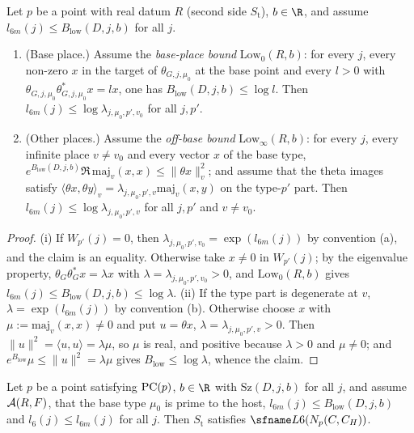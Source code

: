 \begin{lemma}\label{pf:onto3:lowplaces}
Let $p$ be a point with real datum $R$ (second side $S_{\mathrm t}$), $b\in\R$, and assume
$l_{6m}(j)\le B_{\mathrm{low}}(D,j,b)$ for all $j$.
\begin{enumerate}[label=(\roman*)]
\item (Base place.) Assume the \emph{base-place bound} $\mathrm{Low}_0(R,b)$: for every $j$, every non-zero $x$ in
the target of $\theta_{G,j,\mu_0}$ at the base point and every $l>0$ with $\theta_{G,j,\mu_0}\theta_{G,j,\mu_0}^*x=lx$,
one has $B_{\mathrm{low}}(D,j,b)\le\log l$. Then $l_{6m}(j)\le\log\lambda_{j,\mu_0,p',v_0}$ for all $j,p'$.
\item (Other places.) Assume the \emph{off-base bound} $\mathrm{Low}_\infty(R,b)$: for every $j$, every infinite
place $v\ne v_0$ and every vector $x$ of the base type, $e^{B_{\mathrm{low}}(D,j,b)}\Re\,\mathrm{maj}_v(x,x)\le
\|\theta x\|_v^2$; and assume that the theta images satisfy $\langle\theta x,\theta y\rangle_v=
\lambda_{j,\mu_0,p',v}\mathrm{maj}_v(x,y)$ on the type-$p'$ part. Then $l_{6m}(j)\le\log\lambda_{j,\mu_0,p',v}$ for
all $j,p'$ and $v\ne v_0$.
\end{enumerate}
\end{lemma}

\begin{proof}
(i) If $W_{p'}(j)=0$, then $\lambda_{j,\mu_0,p',v_0}=\exp(l_{6m}(j))$ by convention (a), and the claim is an
equality. Otherwise take $x\ne0$ in $W_{p'}(j)$; by the eigenvalue property, $\theta_G\theta_G^*x=\lambda x$ with
$\lambda=\lambda_{j,\mu_0,p',v_0}>0$, and $\mathrm{Low}_0(R,b)$ gives $l_{6m}(j)\le B_{\mathrm{low}}(D,j,b)\le
\log\lambda$.
(ii) If the type part is degenerate at $v$, $\lambda=\exp(l_{6m}(j))$ by convention (b). Otherwise choose $x$ with
$\mu:=\mathrm{maj}_v(x,x)\ne0$ and put $u=\theta x$, $\lambda=\lambda_{j,\mu_0,p',v}>0$. Then
$\|u\|^2=\langle u,u\rangle=\lambda\mu$, so $\mu$ is real, and positive because $\lambda>0$ and $\mu\ne0$; and
$e^{B_{\mathrm{low}}}\mu\le\|u\|^2=\lambda\mu$ gives $B_{\mathrm{low}}\le\log\lambda$, whence the claim.
\end{proof}

\begin{proposition}\label{pf:onto3:lamweak}
Let $p$ be a point satisfying $\mathrm{PC}(p)$, $b\in\R$ with $\mathrm{Sz}(D,j,b)$ for all $j$, and assume
$\mathcal{A}(R,F)$, that the base type $\mu_0$ is prime to the host, $l_{6m}(j)\le B_{\mathrm{low}}(D,j,b)$ and
$l_6(j)\le l_{6m}(j)$ for all $j$. Then $S_{\mathrm t}$ satisfies $\ontothreeLsix(N_p(C,C_H))$.
\end{proposition}

